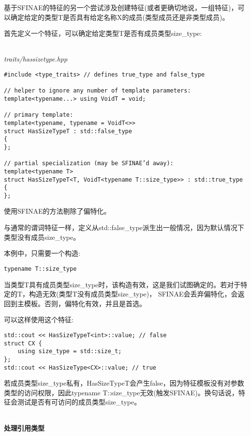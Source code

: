 
基于SFINAE的特征的另一个尝试涉及创建特征(或者更确切地说，一组特征)，可以确定给定的类型T是否具有给定名称X的成员(类型成员还是非类型成员)。


首先定义一个特征，可以确定给定类型T是否有成员类型size\_type:

\hspace*{\fill} \\ %
\noindent
\textit{traits/hassizetype.hpp}
\begin{lstlisting}[style=styleCXX]
#include <type_traits> // defines true_type and false_type

// helper to ignore any number of template parameters:
template<typename...> using VoidT = void;

// primary template:
template<typename, typename = VoidT<>>
struct HasSizeTypeT : std::false_type
{
};

// partial specialization (may be SFINAE’d away):
template<typename T>
struct HasSizeTypeT<T, VoidT<typename T::size_type>> : std::true_type
{
};
\end{lstlisting}

使用SFINAE的方法剔除了偏特化。

与通常的谓词特征一样，定义从std::false\_type派生出一般情况，因为默认情况下类型没有成员size\_type。

本例中，只需要一个构造:

\begin{lstlisting}[style=styleCXX]
typename T::size_type
\end{lstlisting}

当类型T具有成员类型size\_type时，该构造有效，这是我们试图确定的。若对于特定的T，构造无效(类型T没有成员类型size\_type)， SFINAE会丢弃偏特化，会返回到主模板。否则，偏特化有效，并且是首选。

可以这样使用这个特征:

\begin{lstlisting}[style=styleCXX]
std::cout << HasSizeTypeT<int>::value; // false
struct CX {
	using size_type = std::size_t;
};
std::cout << HasSizeType<CX>::value; // true
\end{lstlisting}

若成员类型size\_type私有，HasSizeTypeT会产生false，因为特征模板没有对参数类型的访问权限，因此typename T::size\_type无效(触发SFINAE)。换句话说，特征会测试是否有可访问的成员类型size\_type。

\hspace*{\fill} \\ %
\noindent
\textbf{处理引用类型}

